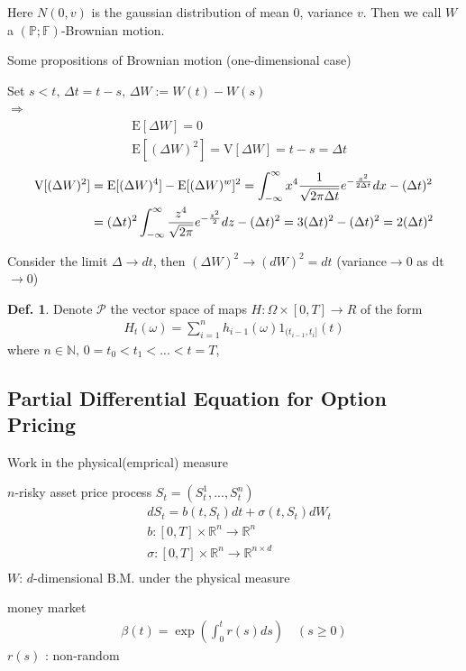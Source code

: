 \documentclass[a4paper,11pt]{jsarticle}
\theoremstyle{definition}
\newtheorem{definition}{Def.}[subsection]
\newcommand{\df}[2]{\dfrac{#1}{#2}}
\newcommand{\intinf}{\int_{-\infty}^{\infty}}
\begin{document}
Here $N(0,v)$ is the gaussian distribution of mean $0$,
variance $v$.
Then we call $W$ a $(\mathbb{P};\mathbb{F})$-Brownian motion.

Some propositions of Brownian motion (one-dimensional case)

Set $s<t, \, \Delta t=t-s, \, \Delta W:=W(t)-W(s)$ \\
$\Rightarrow$
\begin{align}
  &\mathrm{E}[\Delta W]=0 \\
  &\mathrm{E}[(\Delta W)^2]=\mathrm{V}[\Delta W]=t-s=\Delta t
\end{align}
\begin{align}
  \mathrm{V}[(\Delta W)^2]
  &=\mathrm{E}[(\Delta W)^4]-\mathrm{E}[(\Delta W)^w]^2
  =\intinf x^4 \df{1}{\sqrt{2\pi\Delta t}}
  e^{-\frac{x^2}{2\Delta t}}dx - (\Delta t)^2 \notag \\
  &=(\Delta t)^2 \intinf \df{z^4}{\sqrt{2\pi}}
  e^{-\frac{z^2}{2}}dz - (\Delta t)^2 
  =3(\Delta t)^2 - (\Delta t)^2 = 2(\Delta t)^2
\end{align}

Consider the limit $\Delta \to dt$,
then $(\Delta W)^2 \to (dW)^2=dt$ (variance$\to 0$ as dt$\to 0$)

\begin{definition}
  Denote $\mathcal{P}$ the vector space of maps
  $H:\Omega\times[0,T]\to R$ of the form
  \begin{align}
    H_t(\omega)=\sum_{i=1}^n h_{i-1}(\omega)
    1_{(t_{i-1},t_i]} (t)
  \end{align}
  where $n\in \mathbb{N}, \, 0=t_0<t_1<...<t=T$,
\end{definition}

\subsection{Partial Differential Equation for Option Pricing}
Work in the physical(emprical) measure

$n$-risky asset price process $S_t=(S_t^1,...,S_t^n)$
\begin{align}
  &dS_t=b(t,S_t)dt+\sigma(t,S_t)dW_t \\
  &b:[0,T]\times\mathbb{R}^n \to \mathbb{R}^n \\
  &\sigma:[0,T]\times\mathbb{R}^n \to \mathbb{R}^{n\times d}\\
\end{align}
$W$: $d$-dimensional B.M. under the physical measure

money market
\begin{align}
  \beta(t) = \exp\left(\int_0^t r(s)ds \right)
  \quad (s\geq 0)
\end{align}
$r(s)$ : non-random
\end{document}
